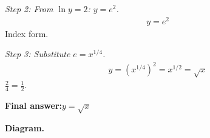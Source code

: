 \documentclass[11pt]{article}
\begin{document}
\textit{Step 2: From \( \ln y = 2 \): \( y = e^2 \).}
\[\begin{gathered}
y = e^2
\end{gathered}\]
Index form.

\textit{Step 3: Substitute \( e = x^{1/4} \).}
\[\begin{gathered}
y = \left(x^{1/4}\right)^2 = x^{1/2} = \sqrt{x}
\end{gathered}\]
\( \frac{2}{4} = \frac{1}{2} \).

\begin{answerbox}
\textbf{Final answer:}\quad \(\displaystyle  y = \sqrt{x} \)
\end{answerbox}
\textbf{Diagram.}

\begin{center}
\end{center}
\end{document}
